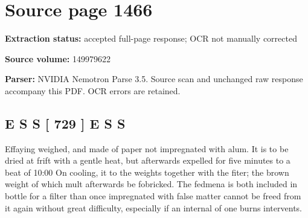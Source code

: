 \clearpage
\section{Source page 1466}
\textbf{Extraction status:} accepted full-page response; OCR not manually corrected\par
\textbf{Source volume:} 149979622\par
\textbf{Parser:} NVIDIA Nemotron Parse 3.5. Source scan and unchanged raw response accompany this PDF. OCR errors are retained.\par\medskip
\subsection*{E S S [ 729 ] E S S}
Effaying weighed, and made of paper not impregnated with alum. It is to be dried at frift with a gentle heat, but afterwards expelled for five minutes to a beat of 10:00 On cooling, it to the weights together with the fiter; the brown weight of which mult afterwards be fobricked. The fedmena is both included in bottle for a filter than once impregnated with false matter cannot be freed from it again without great difficulty, especially if an internal of one burns intervents.\par\medskip
